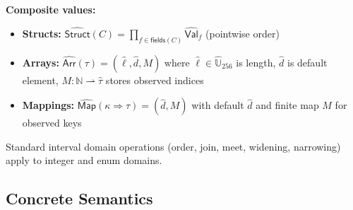 \documentclass[pdflatex,sn-basic]{sn-jnl}%
\theoremstyle{thmstyleone}%
\theoremstyle{thmstyletwo}%
\theoremstyle{thmstylethree}%
\begin{document}
\noindent\textbf{Composite values:}
\begin{itemize}
\item \textbf{Structs:} $\widehat{\mathsf{Struct}}(C) = \prod_{f\in\mathsf{fields}(C)} \widehat{\mathsf{Val}}_f$ (pointwise order)
\item \textbf{Arrays:} $\widehat{\mathsf{Arr}}(\tau) = (\hat{\ell},\hat{d},M)$ where $\hat{\ell}\in \widehat{\mathbb{U}}_{256}$ is length, $\hat{d}$ is default element, $M:\mathbb{N}\rightharpoonup \widehat{\tau}$ stores observed indices
\item \textbf{Mappings:} $\widehat{\mathsf{Map}}(\kappa\Rightarrow\tau) = (\hat{d},M)$ with default $\hat{d}$ and finite map $M$ for observed keys
\end{itemize}

\medskip
\noindent
Standard interval domain operations (order, join, meet, widening, narrowing) apply to integer and enum domains.

\subsection{Concrete Semantics}
\end{document}
